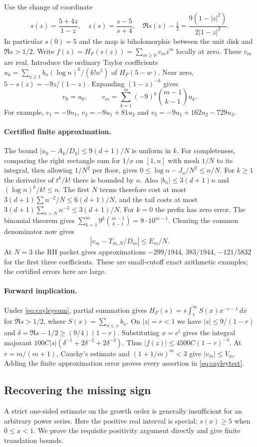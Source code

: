 Use the change of coordinate
\[
 s(z)=\frac{5+4z}{1-z},\quad z(s)=\frac{s-5}{s+4},\quad
 \Re s(z)-\tfrac12=\frac{9(1-|z|^2)}{2|1-z|^2}.
\]
In particular $s(0)=5$ and the map is biholomorphic between the unit disk
and $\Re s>1/2$. Write $f(z)=H_F(s(z))=\sum_{m\ge0}v_m z^m$ locally
at zero. These $v_m$ are real. Introduce the ordinary Taylor coefficients
$u_k=\sum_{n\ge1} b_n(\log n)^k/(k!n^5)$ of $H_F(5-w)$. Near zero,
$5-s(z)=-9z/(1-z)$. Expanding $(1-z)^{-k}$ gives
\[
 v_0=u_0,\qquad
 v_m=\sum_{k=1}^m(-9)^k\binom{m-1}{k-1}u_k .
\]
For example, $v_1=-9u_1$, $v_2=-9u_1+81u_2$ and
$v_3=-9u_1+162u_2-729u_3$.

\paragraph{Certified finite approximation.}
The bound $|u_k-A_k/D_k|\le9(d+1)/N$ is uniform in $k$.
For completeness, comparing the right rectangle sum for $1/x$ on
$[1,n]$ with mesh $1/N$ to its integral, then allowing $1/N^2$ per
floor, gives $0\le\log n-J_n/N^2\le n/N$.
For $k\ge1$ the derivative of $t^k/k!$ there is bounded by $n$.
Also $|b_n|\le3(d+1)n$ and $(\log n)^k/k!\le n$. The first $N$
terms therefore cost at most $3(d+1)\sum n^{-2}/N\le6(d+1)/N$,
and the tail costs at most $3(d+1)\sum_{n>N}n^{-3}\le3(d+1)/N$.
For $k=0$ the prefix has zero error. The binomial theorem gives
$\sum_{k=1}^m9^k\binom{m-1}{k-1}=9\cdot10^{m-1}$. Clearing the
common denominator now gives
\[
              |v_m-T_{m,N}/D_m|\le E_m/N .
\]
At $N=3$ the RH packet gives approximations $-299/1944$, $383/1944$,
$-121/5832$ for the first three coefficients. These are small-cutoff
exact arithmetic examples; the certified errors here are large.

\paragraph{Forward implication.}
Under \eqref{eq:cayleysum}, partial summation gives
$H_F(s)=s\int_1^\infty S(x)x^{-s-1}\,dx$ for $\Re s>1/2$,
where $S(x)=\sum_{n\le x}b_n$. On $|z|=r<1$ we have
$|s|\le9/(1-r)$ and $\delta=\Re s-1/2\ge(9/4)(1-r)$.
Substituting $x=e^t$ gives the integral majorant
$100C|s|(\delta^{-1}+2\delta^{-2}+2\delta^{-3})$.
Thus $|f(z)|\le4500C(1-r)^{-4}$. At $r=m/(m+1)$, Cauchy's
estimate and $(1+1/m)^m<3$ give $|v_m|\le V_m$. Adding the finite
approximation error proves every assertion in \eqref{eq:cayleytest}.

\subsection*{Recovering the missing sign}
A strict one-sided estimate on the growth order is generally insufficient
for an arbitrary power series. Here the positive real interval is special:
$s(x)\ge5$ when $0\le x<1$. We prove the requisite positivity
argument directly and give finite translation bounds.

